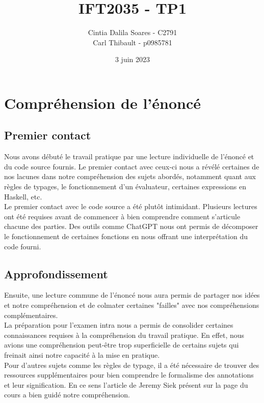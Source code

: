 \documentclass[11pt, letterpaper]{article}
\title{IFT2035 - TP1}
\author{Cintia Dalila Soares - C2791\\
 Carl Thibault - p0985781}
\date{3 juin 2023}
\begin{document}
\maketitle

\section{Compréhension de l'énoncé}

\subsection{Premier contact} 
Nous avons débuté le travail pratique par une lecture individuelle de l'énoncé et du code source fournis. Le premier contact avec ceux-ci nous a révélé certaines de nos lacunes dans notre compréhension des sujets abordés, notamment quant aux règles de typages, le fonctionnement d'un évaluateur, certaines expressions en Haskell, etc.\\

Le premier contact avec le code source a été plutôt intimidant. Plusieurs lectures ont été requises avant de commencer à bien comprendre comment s'articule chacune des parties. Des outils comme ChatGPT nous ont permis de décomposer le fonctionnement de certaines fonctions en nous offrant une interprétation du code fourni.

\subsection{Approfondissement} 

Ensuite, une lecture commune de l'énoncé nous aura permis de partager nos idées et notre compréhension et de colmater certaines "failles" avec nos compréhensions complémentaires.\\

La préparation pour l'examen intra nous a permis de consolider certaines connaissances requises à la compréhension du travail pratique. En effet, nous avions une compréhension peut-être trop superficielle de certains sujets qui freinait ainsi notre capacité à la mise en pratique.\\

Pour d'autres sujets comme les règles de typage, il a été nécessaire de trouver des ressources supplémentaires pour bien comprendre le formalisme des annotations et leur signification. En ce sens l'article de Jeremy Siek présent sur la page du cours a bien guidé notre compréhension.
\end{document}
